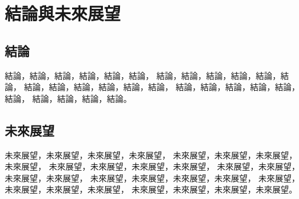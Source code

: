 \chapter {結論與未來展望}
\label{chapter:conclusion}

\section{結論}
\hspace{7mm}
    結論，結論，結論，結論，結論，結論，
    結論，結論，結論，結論，結論，結論，
    結論，結論，結論，結論，結論，結論，
    結論，結論，結論，結論，結論，結論，
    結論，結論，結論，結論。

\section{未來展望}
\hspace{7mm}
    未來展望，未來展望，未來展望，未來展望，
    未來展望，未來展望，未來展望，未來展望，
    未來展望，未來展望，未來展望，未來展望，
    未來展望，未來展望，未來展望，未來展望，
    未來展望，未來展望，未來展望，未來展望，
    未來展望，未來展望，未來展望，未來展望，
    未來展望，未來展望，未來展望，未來展望。

